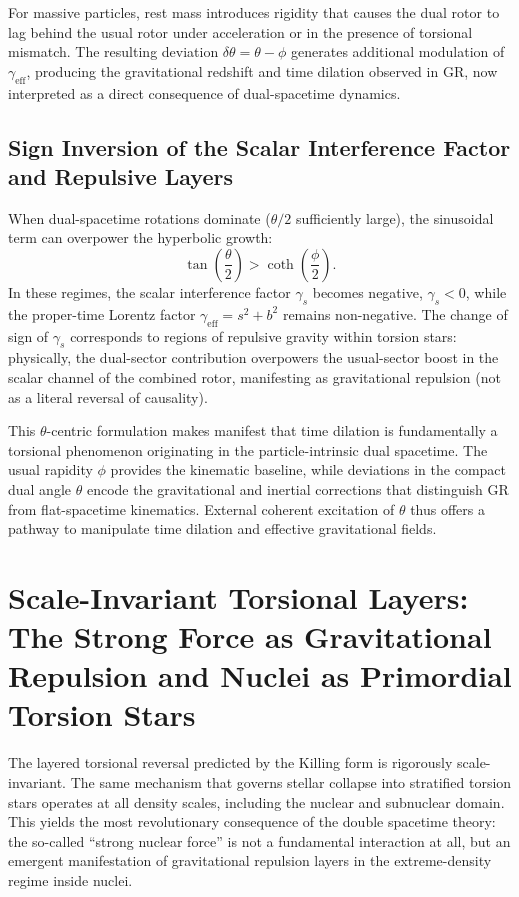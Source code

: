 \documentclass[dvipdfmx,a4paper]{article}
\begin{document}
For massive particles, rest mass introduces rigidity that causes the dual rotor to lag behind the usual rotor under acceleration or in the presence of torsional mismatch. The resulting deviation $\delta\theta = \theta - \phi$ generates additional modulation of $\gamma_{\text{eff}}$, producing the gravitational redshift and time dilation observed in GR, now interpreted as a direct consequence of dual-spacetime dynamics.

\subsection{Sign Inversion of the Scalar Interference Factor and Repulsive Layers}

When dual-spacetime rotations dominate ($\theta/2$ sufficiently large), the sinusoidal term can overpower the hyperbolic growth:
\[
\tan\left(\frac{\theta}{2}\right) > \coth\left(\frac{\phi}{2}\right).
\]
In these regimes, the scalar interference factor $\gamma_s$ becomes negative, $\gamma_s < 0$, while the proper-time Lorentz factor $\gamma_\text{eff} = s^2 + b^2$ remains non-negative. The change of sign of $\gamma_s$ corresponds to regions of repulsive gravity within torsion stars: physically, the dual-sector contribution overpowers the usual-sector boost in the scalar channel of the combined rotor, manifesting as gravitational repulsion (not as a literal reversal of causality).

This $\theta$-centric formulation makes manifest that time dilation is fundamentally a torsional phenomenon originating in the particle-intrinsic dual spacetime. The usual rapidity $\phi$ provides the kinematic baseline, while deviations in the compact dual angle $\theta$ encode the gravitational and inertial corrections that distinguish GR from flat-spacetime kinematics. External coherent excitation of $\theta$ thus offers a pathway to manipulate time dilation and effective gravitational fields.

\section{Scale-Invariant Torsional Layers: The Strong Force as Gravitational Repulsion and Nuclei as Primordial Torsion Stars}
\label{sec:nuclear}

The layered torsional reversal predicted by the Killing form is rigorously scale-invariant. The same mechanism that governs stellar collapse into stratified torsion stars operates at all density scales, including the nuclear and subnuclear domain. This yields the most revolutionary consequence of the double spacetime theory: the so-called ``strong nuclear force'' is not a fundamental interaction at all, but an emergent manifestation of gravitational repulsion layers in the extreme-density regime inside nuclei.
\end{document}
